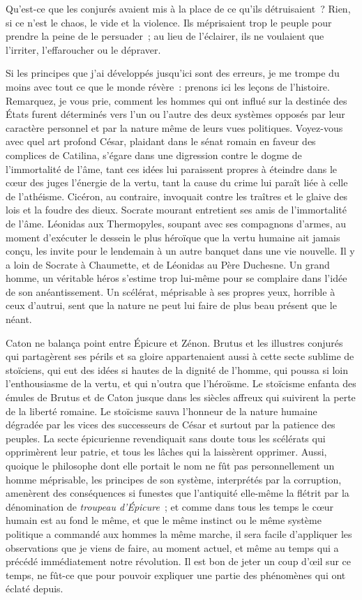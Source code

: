 \documentclass[french,twoside]{book} %
\begin{document}
Qu’est-ce que les conjurés avaient mis à la place de ce qu’ils détruisaient ? Rien, si ce n’est le chaos, le vide et la violence. Ils méprisaient trop le peuple pour prendre la peine de le persuader ; au lieu de l’éclairer, ils ne voulaient que l’irriter, l’effaroucher ou le dépraver.\par
Si les principes que j’ai développés jusqu’ici sont des erreurs, je me trompe du moins avec tout ce que le monde révère : prenons ici les leçons de l’histoire. Remarquez, je vous prie, comment les hommes qui ont influé sur la destinée des États furent déterminés vers l’un ou l’autre des deux systèmes opposés par leur caractère personnel et par la nature même de leurs vues politiques. Voyez-vous avec quel art profond César, plaidant dans le sénat romain en faveur des complices de Catilina, s’égare dans une digression contre le dogme de l’immortalité de l’âme, tant ces idées lui paraissent propres à éteindre dans le cœur des juges l’énergie de la vertu, tant la cause du crime lui paraît liée à celle de l’athéisme. Cicéron, au contraire, invoquait contre les traîtres et le glaive des lois et la foudre des dieux. Socrate mourant entretient ses amis de l’immortalité de l’âme. Léonidas aux Thermopyles, soupant avec ses compagnons d’armes, au moment d’exécuter le dessein le plus héroïque que la vertu humaine ait jamais conçu, les invite pour le lendemain à un autre banquet dans une vie nouvelle. Il y a loin de Socrate à Chaumette, et de Léonidas au Père Duchesne. Un grand homme, un véritable héros s’estime trop lui-même pour se complaire dans l’idée de son anéantissement. Un scélérat, méprisable à ses propres yeux, horrible à ceux d’autrui, sent que la nature ne peut lui faire de plus beau présent que le néant.\par
Caton ne balança point entre Épicure et Zénon. Brutus et les illustres conjurés qui partagèrent ses périls et sa gloire appartenaient aussi à cette secte sublime de stoïciens, qui eut des idées si hautes de la dignité de l’homme, qui poussa si loin l’enthousiasme de la vertu, et qui n’outra que l’héroïsme. Le stoïcisme enfanta des émules de Brutus et de Caton jusque dans les siècles affreux qui suivirent la perte de la liberté romaine. Le stoïcisme sauva l’honneur de la nature humaine dégradée par les vices des successeurs de César et surtout par la patience des peuples. La secte épicurienne revendiquait sans doute tous les scélérats qui opprimèrent leur patrie, et tous les lâches qui la laissèrent opprimer. Aussi, quoique le philosophe dont elle portait le nom ne fût pas personnellement un homme méprisable, les principes de son système, interprétés par la corruption, amenèrent des conséquences si funestes que l’antiquité elle-même la flétrit par la dénomination de {\itshape troupeau d’Épicure} ; et comme dans tous les temps le cœur humain est au fond le même, et que le même instinct ou le même système politique a commandé aux hommes la même marche, il sera facile d’appliquer les observations que je viens de faire, au moment actuel, et même au temps qui a précédé immédiatement notre révolution. Il est bon de jeter un coup d’œil sur ce temps, ne fût-ce que pour pouvoir expliquer une partie des phénomènes qui ont éclaté depuis.\par
\end{document}
